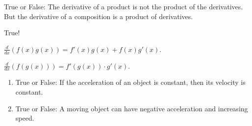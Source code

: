 \documentclass[handout,nooutcomes]{ximera}
\renewenvironment{freeResponse}{
\ifhandout\setbox0\vbox\bgroup\else
\begin{trivlist}\item[\hskip \labelsep\bfseries Solution:\hspace{2ex}]
\fi}
{\ifhandout\egroup\else
\end{trivlist}
\fi}
\newcommand{\ddx}{\frac{d}{dx}}
\begin{document}
\begin{problem}
    True or False: The derivative of a product is not the product of the derivatives.  But the derivative of a composition is a product of derivatives.
		\begin{freeResponse}
		True!
		
		$\ddx (f(x) g(x)) = f'(x) g(x) + f(x) g'(x)$.
		
		$\ddx(f(g(x))) = f'(g(x)) \cdot g'(x)$.
		\end{freeResponse}	
\end{problem}

\begin{problem}
  \mbox{}
  \begin{enumerate}
    \item
      True or False:  If the acceleration of an object is constant, then its velocity is constant.
	
	\item  True or False:  A moving object can have negative acceleration and increasing speed.

	\end{enumerate}
\end{problem}
\end{document}
